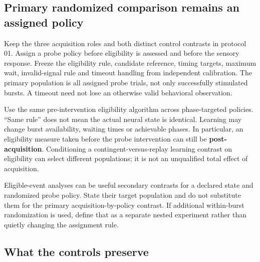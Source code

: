 \documentclass[
  american,
  11pt,
  letterpaper,
]{article}
\begin{document}
\subsection{Primary randomized comparison remains an assigned policy}\label{primary-randomized-comparison-remains-an-assigned-policy}

Keep the three acquisition roles and both distinct control contrasts in protocol 01. Assign a probe policy before eligibility is assessed and before the sensory response. Freeze the eligibility rule, candidate reference, timing targets, maximum wait, invalid-signal rule and timeout handling from independent calibration. The primary population is all assigned probe trials, not only successfully stimulated bursts. A timeout need not lose an otherwise valid behavioral observation.

Use the same pre-intervention eligibility algorithm across phase-targeted policies. ``Same rule'' does not mean the actual neural state is identical. Learning may change burst availability, waiting times or achievable phases. In particular, an eligibility measure taken before the probe intervention can still be \textbf{post-acquisition}. Conditioning a contingent-versus-replay learning contrast on eligibility can select different populations; it is not an unqualified total effect of acquisition.

Eligible-event analyses can be useful secondary contrasts for a declared state and randomized probe policy. State their target population and do not substitute them for the primary acquisition-by-policy contrast. If additional within-burst randomization is used, define that as a separate nested experiment rather than quietly changing the assignment rule.

\subsection{What the controls preserve}\label{what-the-controls-preserve}
\end{document}
